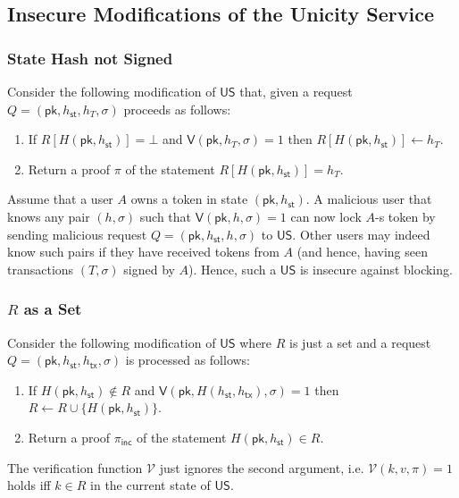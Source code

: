 \documentclass{article}
\newcommand{\sigver}[0]{\mathsf{V}}
\newcommand{\pubkey}[0]{\mathsf{pk}}
\newcommand{\unisrv}[0]{\mathsf{US}}
\newcommand{\sthash}[0]{h_\mathsf{st}}
\newcommand{\txhash}[0]{h_\mathsf{tx}}
\newcommand{\univer}[0]{\mathcal{V}}
\newcommand{\pinc}[0]{\pi_{\mathsf{inc}}}
\begin{document}
\subsection{Insecure Modifications of the Unicity Service}

\subsubsection{State Hash not Signed}

Consider the following modification of $\mathsf{US}$ that, given a request $Q=(\pubkey, h_\mathsf{st}, h_T, \sigma)$ proceeds as follows:
\begin{enumerate}
\item If $R[H(\pubkey, h_\mathsf{st})]=\bot$ and $\sigver(\pubkey, h_T, \sigma)=1$ then $R[H(\pubkey, h_\mathsf{st})]\gets h_T$.
\item Return a proof $\pi$ of the statement $R[H(\pubkey, h_\mathsf{st})]=h_T$.
\end{enumerate}

\noindent Assume that a user $A$ owns a token in state $(\pubkey,\sthash)$.
A malicious user that knows any pair  $(h,\sigma)$ such that $\sigver(\pubkey,h,\sigma)=1$
can now lock $A$-s token by sending malicious request $Q=(\pubkey,\sthash, h, \sigma)$ to $\mathsf{US}$.
Other users may indeed know such pairs if they have received tokens from $A$ (and hence, having seen transactions $(T,\sigma)$ signed by $A$).
Hence, such a $\unisrv$ is insecure against blocking.

\subsubsection{$R$ as a Set}

Consider the following modification of $\mathsf{US}$ where $R$ is just a set and a request $Q=(\pubkey, \sthash, \txhash, \sigma)$ is processed as follows:
\begin{enumerate}
\item If $H(\pubkey, \sthash)\not\in R$ and $\mathsf{V}(\pubkey, H(\sthash, \txhash), \sigma)=1$ then $R\gets R \cup \{H(\pubkey, \sthash)\}$.
\item Return a proof $\pinc$ of the statement $H(\pubkey, \sthash)\in R$.
\end{enumerate}

\noindent The verification function $\univer$ just ignores the second argument, i.e.  $\univer(k,v,\pi)=1$ holds iff $k\in R$ in the current state of $\unisrv$. \medskip
\end{document}
